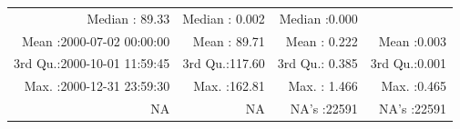 \documentclass[
  10pt,
  a4paper,oneside]{article}
\begin{document}
\begin{longtable}[]{@{}rrrr@{}}
\begin{minipage}[t]{0.19\columnwidth}
Median : 89.33\strut
\end{minipage} & \begin{minipage}[t]{0.19\columnwidth}\raggedleft
Median : 0.002\strut
\end{minipage} & \begin{minipage}[t]{0.19\columnwidth}\raggedleft
Median :0.000\strut
\end{minipage}\tabularnewline
\begin{minipage}[t]{0.33\columnwidth}\raggedleft
Mean :2000-07-02 00:00:00\strut
\end{minipage} & \begin{minipage}[t]{0.19\columnwidth}\raggedleft
Mean : 89.71\strut
\end{minipage} & \begin{minipage}[t]{0.19\columnwidth}\raggedleft
Mean : 0.222\strut
\end{minipage} & \begin{minipage}[t]{0.19\columnwidth}\raggedleft
Mean :0.003\strut
\end{minipage}\tabularnewline
\begin{minipage}[t]{0.33\columnwidth}\raggedleft
3rd Qu.:2000-10-01 11:59:45\strut
\end{minipage} & \begin{minipage}[t]{0.19\columnwidth}\raggedleft
3rd Qu.:117.60\strut
\end{minipage} & \begin{minipage}[t]{0.19\columnwidth}\raggedleft
3rd Qu.: 0.385\strut
\end{minipage} & \begin{minipage}[t]{0.19\columnwidth}\raggedleft
3rd Qu.:0.001\strut
\end{minipage}\tabularnewline
\begin{minipage}[t]{0.33\columnwidth}\raggedleft
Max. :2000-12-31 23:59:30\strut
\end{minipage} & \begin{minipage}[t]{0.19\columnwidth}\raggedleft
Max. :162.81\strut
\end{minipage} & \begin{minipage}[t]{0.19\columnwidth}\raggedleft
Max. : 1.466\strut
\end{minipage} & \begin{minipage}[t]{0.19\columnwidth}\raggedleft
Max. :0.465\strut
\end{minipage}\tabularnewline
\begin{minipage}[t]{0.33\columnwidth}\raggedleft
NA\strut
\end{minipage} & \begin{minipage}[t]{0.19\columnwidth}\raggedleft
NA\strut
\end{minipage} & \begin{minipage}[t]{0.19\columnwidth}\raggedleft
NA's :22591\strut
\end{minipage} & \begin{minipage}[t]{0.19\columnwidth}\raggedleft
NA's :22591\strut
\end{minipage}\tabularnewline
\bottomrule
\end{longtable}
\end{document}
